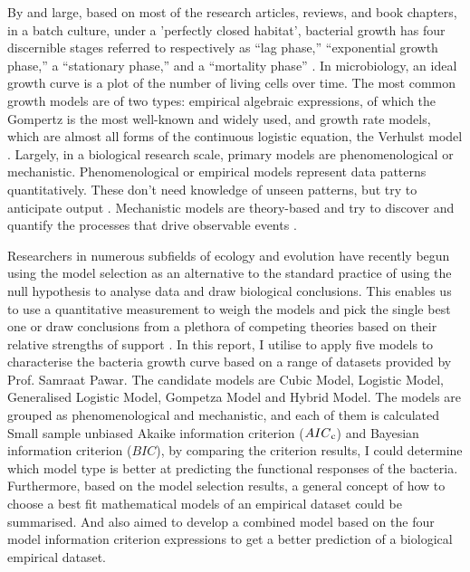 \documentclass[a4paper]{report}
\begin{document}
\begin{linenumbers}
    By and large, based on most of the research articles, reviews, and book chapters, in a batch culture, under a 'perfectly closed habitat', bacterial growth has four discernible stages referred to respectively as “lag phase,” “exponential growth phase,” a “stationary phase,” and a “mortality phase” \citep{zwietering1990modeling, mckellar2004primary}. In microbiology, an ideal growth curve is a plot of the number of living cells over time. The most common growth models are of two types: empirical algebraic expressions, of which the Gompertz is the most well-known and widely used, and growth rate models, which are almost all forms of the continuous logistic equation, the Verhulst model \citep{peleg2011microbial}. Largely, in a biological research scale, primary models are phenomenological or mechanistic. Phenomenological or empirical models represent data patterns quantitatively. These don't need knowledge of unseen patterns, but try to anticipate output \citep{vlazaki2019integrating}. Mechanistic models are theory-based and try to discover and quantify the processes that drive observable events \citep{lopez2004statistical, ferrer2009mathematical}. 
    
    Researchers in numerous subfields of ecology and evolution have recently begun using the model selection as an alternative to the standard practice of using the null hypothesis to analyse data and draw biological conclusions. This enables us to use a quantitative measurement to weigh the models and pick the single best one or draw conclusions from a plethora of competing theories based on their relative strengths of support \citep{johnson2004model}. In this report, I utilise to apply five models to characterise the bacteria growth curve based on a range of datasets provided by Prof. Samraat Pawar. The candidate models are Cubic Model, Logistic Model, Generalised Logistic Model, Gompetza Model and Hybrid Model. The models are grouped as phenomenological and mechanistic, and each of them is calculated Small sample unbiased Akaike information criterion ($AIC\textsubscript{c}$) and Bayesian information criterion ($BIC$), by comparing the criterion results, I could determine which model type is better at predicting the functional responses of the bacteria. Furthermore, based on the model selection results, a general concept of how to choose a best fit mathematical models of an empirical dataset could be summarised. And also aimed to develop a combined model based on the four model information criterion expressions to get a better prediction of a biological empirical dataset.
    

\end{linenumbers}
\end{document}
